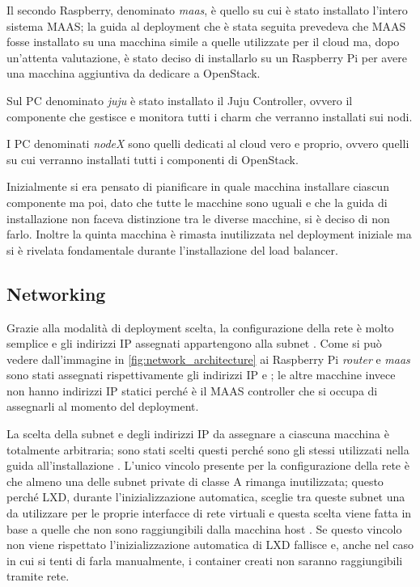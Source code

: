 Il secondo Raspberry, denominato \emph{maas}, è quello su cui è stato installato l'intero sistema MAAS; la guida al deployment che è stata seguita prevedeva che MAAS fosse installato su una macchina simile a quelle utilizzate per il cloud ma, dopo un'attenta valutazione, è stato deciso di installarlo su un Raspberry Pi per avere una macchina aggiuntiva da dedicare a OpenStack.

Sul PC denominato \emph{juju} è stato installato il Juju Controller, ovvero il componente che gestisce e monitora tutti i charm che verranno installati sui nodi. 

I PC denominati \emph{nodeX} sono quelli dedicati al cloud vero e proprio, ovvero quelli su cui verranno installati tutti i componenti di OpenStack.

Inizialmente si era pensato di pianificare in quale macchina installare ciascun componente ma poi, dato che tutte le macchine sono uguali e che la guida di installazione non faceva distinzione tra le diverse macchine, si è deciso di non farlo. 
% 
Inoltre la quinta macchina è rimasta inutilizzata nel deployment iniziale ma si è rivelata fondamentale durante l'installazione del load balancer.



\subsection{Networking}\label{subsubsec:progettazione_networking}
Grazie alla modalità di deployment scelta, la configurazione della rete è molto semplice e gli indirizzi IP assegnati appartengono alla subnet . 
% 
Come si può vedere dall'immagine in \cref{fig:network_architecture} ai Raspberry Pi \emph{router} e \emph{maas} sono stati assegnati rispettivamente gli indirizzi IP  e ;
% 
le altre macchine invece non hanno indirizzi IP statici perché è il MAAS controller che si occupa di assegnarli al momento del deployment.

La scelta della subnet e degli indirizzi IP da assegnare a ciascuna macchina è totalmente arbitraria; 
% 
sono stati scelti questi perché sono gli stessi utilizzati nella guida all'installazione \cite{openstack_installation_juju}. 
% 
L'unico vincolo presente per la configurazione della rete è che almeno una delle subnet private di classe A rimanga inutilizzata; 
% 
questo perché LXD, durante l'inizializzazione automatica, sceglie tra queste subnet una da utilizzare per le proprie interfacce di rete virtuali e questa scelta viene fatta in base a quelle che non sono raggiungibili dalla macchina host \cite{lxd_init_network_error}. 
% 
Se questo vincolo non viene rispettato l'inizializzazione automatica di LXD fallisce e, anche nel caso in cui si tenti di farla manualmente, i container creati non saranno raggiungibili tramite rete.

